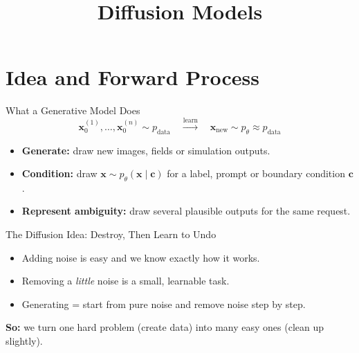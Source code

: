 \documentclass{ntuabeamer}
\title{Diffusion Models}
\author{}
\date{}
\begin{document}
\begin{frame}[plain]\makepresentationtitle\end{frame}

\section{Idea and Forward Process}

\begin{frame}{What a Generative Model Does}
  \[\mathbf x_0^{(1)},\ldots,\mathbf x_0^{(n)}\sim p_{\mathrm{data}}
    \quad\xrightarrow{\text{learn}}\quad
    \mathbf x_{\mathrm{new}}\sim p_\theta\approx p_{\mathrm{data}}\]
  \begin{itemize}
    \item \textbf{Generate:} draw new images, fields or simulation outputs.
    \item \textbf{Condition:} draw \(\mathbf x\sim p_\theta(\mathbf x\mid\mathbf c)\) for a label, prompt or boundary condition \(\mathbf c\).
    \item \textbf{Represent ambiguity:} draw several plausible outputs for the same request.
  \end{itemize}
\end{frame}

\begin{frame}{The Diffusion Idea: Destroy, Then Learn to Undo}
  \centering
  \vspace{0.3cm}
  \begin{itemize}
    \item Adding noise is easy and we know exactly how it works.
    \item Removing a \emph{little} noise is a small, learnable task.
    \item Generating = start from pure noise and remove noise step by step.
  \end{itemize}
  \textbf{So:} we turn one hard problem (create data) into many easy ones (clean up slightly).
\end{frame}
\end{document}
